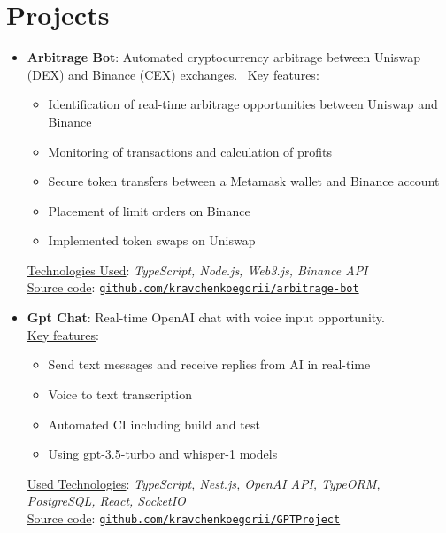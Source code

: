 \section{Projects}\label{sec:projects}
\begin{itemize}[noitemsep]
    \item{\textbf{Arbitrage Bot}}: Automated cryptocurrency arbitrage between Uniswap (DEX) and Binance (CEX) exchanges.
    \ \underline{Key features}:
    \begin{itemize}[noitemsep]
        \item Identification of real-time arbitrage opportunities between Uniswap and Binance
        \item Monitoring of transactions and calculation of profits
        \item Secure token transfers between a Metamask wallet and Binance account
        \item Placement of limit orders on Binance
        \item Implemented token swaps on Uniswap
    \end{itemize}
    \underline{Technologies Used}: \textit{TypeScript, Node.js, Web3.js, Binance API} \\
    \underline{Source code}: \href{https://github.com/kravchenkoegorii/arbitrage-bot}
    {\verb"github.com/kravchenkoegorii/arbitrage-bot"} \\

    \item{\textbf{Gpt Chat}}: Real-time OpenAI chat with voice input opportunity.
    \\ \underline{Key features}:
    \begin{itemize}[noitemsep]
        \item Send text messages and receive replies from AI in real-time
        \item Voice to text transcription
        \item Automated CI including build and test
        \item Using gpt-3.5-turbo and whisper-1 models
    \end{itemize}
    \underline{Used Technologies}: \textit{TypeScript, Nest.js, OpenAI API, TypeORM, PostgreSQL, React, SocketIO} \\
    \underline{Source code}: \href{https://github.com/kravchenkoegorii/GPTProject}
    {\verb"github.com/kravchenkoegorii/GPTProject"} \\


\end{itemize}
